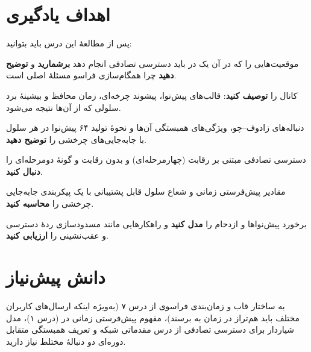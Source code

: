 \documentclass[11pt,a4paper]{article}
\begin{document}
\ACNcover

\section{اهداف یادگیری}
پس از مطالعهٔ این درس باید بتوانید:
\begin{objectives}
  \item موقعیت‌هایی را که در آن یک  در  باید دسترسی تصادفی انجام دهد \textbf{برشمارید} و
        \textbf{توضیح دهید} چرا همگام‌سازی فراسو مسئلهٔ اصلی است.
  \item کانال  را \textbf{توصیف کنید}: قالب‌های پیش‌نوا، پیشوند چرخه‌ای، زمان محافظ و بیشینهٔ برد
        سلولی که از آن‌ها نتیجه می‌شود.
  \item دنباله‌های زادوف--چو، ویژگی‌های همبستگی آن‌ها و نحوهٔ تولید ۶۴ پیش‌نوا در هر سلول با جابه‌جایی‌های
        چرخشی را \textbf{توضیح دهید}.
  \item دسترسی تصادفی مبتنی بر رقابت (چهارمرحله‌ای) و بدون رقابت و گونهٔ دومرحله‌ای  را \textbf{دنبال کنید}.
  \item مقادیر پیش‌فرستی زمانی و شعاع سلول قابل پشتیبانی با یک پیکربندی جابه‌جایی چرخشی را \textbf{محاسبه کنید}.
  \item برخورد پیش‌نواها و ازدحام  را \textbf{مدل کنید} و راهکارهایی مانند مسدودسازی ردهٔ دسترسی و
        عقب‌نشینی را \textbf{ارزیابی کنید}.
\end{objectives}

\section{دانش پیش‌نیاز}
به ساختار قاب و زمان‌بندی فراسوی  از درس ۷ (به‌ویژه اینکه ارسال‌های  کاربران مختلف باید
هم‌تراز در زمان به  برسند)، مفهوم پیش‌فرستی زمانی در  (درس ۱)، مدل  شیاردار برای
دسترسی تصادفی از درس مقدماتی شبکه و تعریف همبستگی متقابل دوره‌ای دو دنبالهٔ مختلط نیاز دارید.
\end{document}
